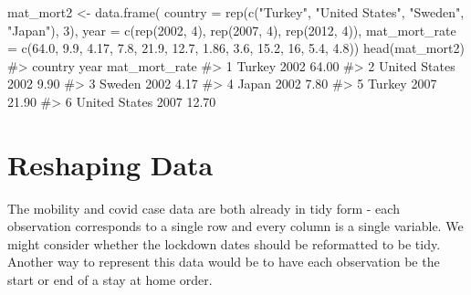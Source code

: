 \documentclass[
  letterpaper,
]{krantz}
\makeatletter
\newenvironment{Shaded}{\begin{snugshade}}{\end{snugshade}}
\newcommand{\AttributeTok}[1]{\textcolor[rgb]{0.40,0.45,0.13}{#1}}
\newcommand{\CommentTok}[1]{\textcolor[rgb]{0.37,0.37,0.37}{#1}}
\newcommand{\DecValTok}[1]{\textcolor[rgb]{0.68,0.00,0.00}{#1}}
\newcommand{\FloatTok}[1]{\textcolor[rgb]{0.68,0.00,0.00}{#1}}
\newcommand{\FunctionTok}[1]{\textcolor[rgb]{0.28,0.35,0.67}{#1}}
\newcommand{\NormalTok}[1]{\textcolor[rgb]{0.00,0.23,0.31}{#1}}
\newcommand{\OtherTok}[1]{\textcolor[rgb]{0.00,0.23,0.31}{#1}}
\newcommand{\StringTok}[1]{\textcolor[rgb]{0.13,0.47,0.30}{#1}}
\newenvironment{kframe}{%
\medskip{}
\setlength{\fboxsep}{.8em}
 \def\at@end@of@kframe{}%
 \ifinner\ifhmode%
  \def\at@end@of@kframe{\end{minipage}}%
  \begin{minipage}{\columnwidth}%
 \fi\fi%
 \def\FrameCommand##1{\hskip\@totalleftmargin \hskip-\fboxsep
 \colorbox{shadecolor}{##1}\hskip-\fboxsep
     \hskip-\linewidth \hskip-\@totalleftmargin \hskip\columnwidth}%
 \MakeFramed {\advance\hsize-\width
   \@totalleftmargin\z@ \linewidth\hsize
   \@setminipage}}%
 {\par\unskip\endMakeFramed%
 \at@end@of@kframe}
\renewenvironment{Shaded}{\begin{kframe}}{\end{kframe}}
\makeatother
\begin{document}
\begin{Shaded}
\begin{Highlighting}[]
\NormalTok{mat\_mort2 }\OtherTok{\textless{}{-}} \FunctionTok{data.frame}\NormalTok{(}
    \AttributeTok{country =} \FunctionTok{rep}\NormalTok{(}\FunctionTok{c}\NormalTok{(}\StringTok{"Turkey"}\NormalTok{, }\StringTok{"United States"}\NormalTok{, }\StringTok{"Sweden"}\NormalTok{, }\StringTok{"Japan"}\NormalTok{), }\DecValTok{3}\NormalTok{),}
    \AttributeTok{year =} \FunctionTok{c}\NormalTok{(}\FunctionTok{rep}\NormalTok{(}\DecValTok{2002}\NormalTok{, }\DecValTok{4}\NormalTok{), }\FunctionTok{rep}\NormalTok{(}\DecValTok{2007}\NormalTok{, }\DecValTok{4}\NormalTok{), }\FunctionTok{rep}\NormalTok{(}\DecValTok{2012}\NormalTok{, }\DecValTok{4}\NormalTok{)),}
    \AttributeTok{mat\_mort\_rate =} \FunctionTok{c}\NormalTok{(}\FloatTok{64.0}\NormalTok{, }\FloatTok{9.9}\NormalTok{, }\FloatTok{4.17}\NormalTok{, }\FloatTok{7.8}\NormalTok{, }\FloatTok{21.9}\NormalTok{, }\FloatTok{12.7}\NormalTok{, }\FloatTok{1.86}\NormalTok{, }\FloatTok{3.6}\NormalTok{, }
                      \FloatTok{15.2}\NormalTok{, }\DecValTok{16}\NormalTok{, }\FloatTok{5.4}\NormalTok{, }\FloatTok{4.8}\NormalTok{))}
\FunctionTok{head}\NormalTok{(mat\_mort2)}
\CommentTok{\#\textgreater{}         country year mat\_mort\_rate}
\CommentTok{\#\textgreater{} 1        Turkey 2002         64.00}
\CommentTok{\#\textgreater{} 2 United States 2002          9.90}
\CommentTok{\#\textgreater{} 3        Sweden 2002          4.17}
\CommentTok{\#\textgreater{} 4         Japan 2002          7.80}
\CommentTok{\#\textgreater{} 5        Turkey 2007         21.90}
\CommentTok{\#\textgreater{} 6 United States 2007         12.70}
\end{Highlighting}
\end{Shaded}

\hypertarget{reshaping-data}{%
\section{Reshaping Data}\label{reshaping-data}}

The mobility and covid case data are both already in tidy form - each
observation corresponds to a single row and every column is a single
variable. We might consider whether the lockdown dates should be
reformatted to be tidy. Another way to represent this data would be to
have each observation be the start or end of a stay at home order.
\end{document}
